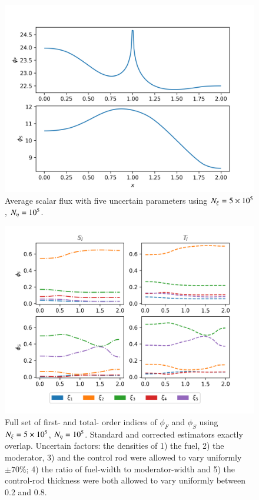 \begin{figure}[ht]
    \centering
    \includegraphics{figures/flux.png} 
    \caption{Average scalar flux with five uncertain parameters using ${N_\xi}=5 \times 10^5$, ${N_\eta}=10^5$.}
    \label{fig:flux}
\end{figure}

\begin{figure}[ht]
    \centering
    \includegraphics{figures/indices.png}
    \caption{Full set of first- and total- order indices of $\phi_F$ and $\phi_S$ using ${N_\xi}=5 \times 10^5$, ${N_\eta}=10^5$. Standard and corrected estimators exactly overlap. Uncertain factors: the densities of 1) the fuel, 2) the moderator, 3) and the control rod were allowed to vary uniformly $\pm 70\%$; 4) the ratio of fuel-width to moderator-width and 5) the control-rod thickness were both allowed to vary uniformly between 0.2 and 0.8. }
    \label{fig:indices}
\end{figure}

